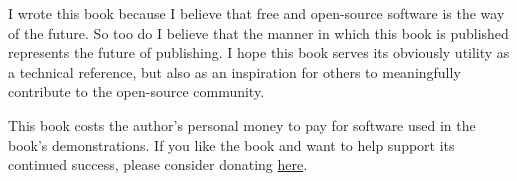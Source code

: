 I wrote this book because I believe that free and open-source software is the
way of the future. So too do I believe that the manner in which this book is
published represents the future of publishing. I hope this book serves its
obviously utility as a technical reference, but also as an inspiration for
others to meaningfully contribute to the open-source community.

This book costs the author's personal money to pay for software used in the
book's demonstrations. If you like the book and want to help support its
continued success, please consider donating
\href{https://www.paypal.com/cgi-bin/webscr?cmd=_donations&business=KA9QZVDMVYN26&lc=US&item_name=Evolving\%20Technology\%20Study\%20Guide&item_number=42518&currency_code=USD&bn=PP\%2dDonationsBF\%3abtn_donate_LG\%2egif\%3aNonHosted}{here}.
